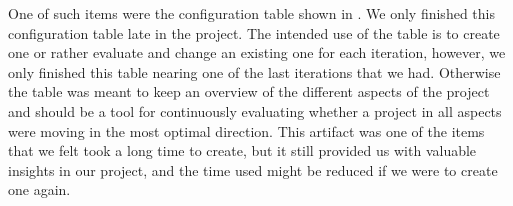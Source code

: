 
One of such items were the configuration table shown in . We only finished this configuration table late in the project. The intended use of the table is to create one or rather evaluate and change an existing one for each iteration, however, we only finished this table nearing one of the last iterations that we had. Otherwise the table was meant to keep an overview of the different aspects of the project and should be a tool for continuously evaluating whether a project in all aspects were moving in the most optimal direction. This artifact was one of the items that we felt took a long time to create, but it still provided us with valuable insights in our project, and the time used might be reduced if we were to create one again.


